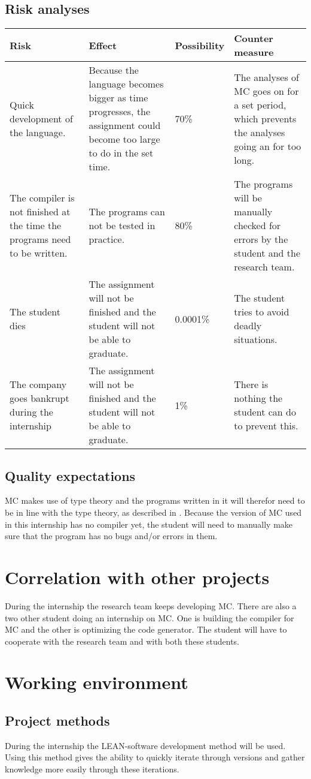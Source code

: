 \subsection{Risk analyses}
\begin{center}
   \begin{tabular}
      {| p{} | p{} | l | p{} |}
      \hline
      \textbf{Risk} & \textbf{Effect} & \textbf{Possibility} & \textbf{Counter measure}
      \\ \hline
      Quick development of the language. & Because the language becomes bigger as time progresses, the assignment could become too large to do in the set time. & 70\% & The analyses of MC goes on for a set period, which prevents the analyses going an for too long.
      \\ \hline
      The compiler is not finished at the time the programs need to be written. & The programs can not be tested in practice. & 80\% & The programs will be manually checked for errors by the student and the research team.
      \\ \hline
      The student dies & The assignment will not be finished and the student will not be able to graduate. & 0.0001\% & The student tries to avoid deadly situations.
      \\ \hline
      The company goes bankrupt during the internship & The assignment will not be finished and the student will not be able to graduate. & 1\% & There is nothing the student can do to prevent this.
      \\ \hline
   \end{tabular}
\end{center}

\subsection{Quality expectations}
MC makes use of type theory and the programs written in it will therefor need to be in line with the type theory, as described in \cite{pierce2002types}.
Because the version of MC used in this internship has no compiler yet, the student will need to manually make sure that the program has no bugs and/or errors in them.

\section{Correlation with other projects}
During the internship the research team keeps developing MC.
There are also a two other student doing an internship on MC.
One is building the compiler for MC and the other is optimizing the code generator.
The student will have to cooperate with the research team and with both these students.

\section{Working environment}
\subsection{Project methods}
During the internship the LEAN-software development method will be used\cite{ries2011lean}.
Using this method gives the ability to quickly iterate through versions and gather knowledge more easily through these iterations.
